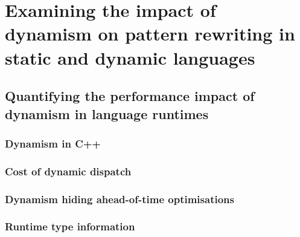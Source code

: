 

\chapter{Examining the impact of dynamism on pattern rewriting in static and dynamic languages}
\label{chap:dynamism-pattern-rewriting}


\section{Quantifying the performance impact of dynamism in language runtimes}


\subsection{Dynamism in C++}


\subsection{Cost of dynamic dispatch}




\subsection{Dynamism hiding ahead-of-time optimisations}





\subsection{Runtime type information}


